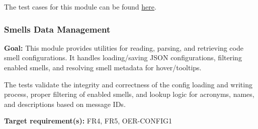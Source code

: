 \documentclass[12pt, titlepage]{article}
\begin{document}
\noindent The test cases for this module can be found
\href{https://github.com/ssm-lab/capstone--sco-vs-code-plugin/blob/plugin-multi-file/test/utils/cacheInitialization.test.ts}{here}.

\subsubsection{Smells Data Management}

\textbf{Goal:} This module provides utilities for reading, parsing, and retrieving code smell configurations. It handles loading/saving JSON configurations, filtering enabled smells, and resolving smell metadata for hover/tooltips.

\medskip

\noindent The tests validate the integrity and correctness of the config loading and writing process, proper filtering of enabled smells, and lookup logic for acronyms, names, and descriptions based on message IDs.

\medskip

\noindent\textbf{Target requirement(s):} FR4, FR5, OER-CONFIG1~\cite{SRS}
\end{document}
